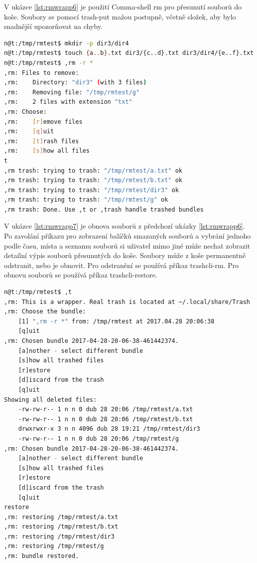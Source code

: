 \documentclass[thesis=M,czech]{FITthesis}[2012/06/26]
\begin{document}
V ukázce \ref{lst:rmwrapp6} je použití Comma-shell rm pro přesunutí souborů do koše. Soubory se pomocí trash-put mažou postupně, včetně složek, aby bylo snadnější upozorňovat na chyby.


\begin{minipage}{\linewidth}
\begin{lstlisting}[language=bash, caption={,rm - přesouvání do koše}, label={lst:rmwrapp6}]
n@t:/tmp/rmtest$ mkdir -p dir3/dir4
n@t:/tmp/rmtest$ touch {a..b}.txt dir3/{c..d}.txt dir3/dir4/{e..f}.txt g
n@t:/tmp/rmtest$ ,rm -r *
,rm: Files to remove:
,rm:    Directory: "dir3" (with 3 files)
,rm:    Removing file: "/tmp/rmtest/g"
,rm:    2 files with extension "txt"
,rm: Choose:
,rm:    [r]emove files
,rm:    [q]uit
,rm:    [t]rash files
,rm:    [s]how all files
t
,rm trash: trying to trash: "/tmp/rmtest/a.txt" ok
,rm trash: trying to trash: "/tmp/rmtest/b.txt" ok
,rm trash: trying to trash: "/tmp/rmtest/dir3" ok
,rm trash: trying to trash: "/tmp/rmtest/g" ok
,rm trash: Done. Use ,t or ,trash handle trashed bundles
\end{lstlisting}
\end{minipage}

V ukázce \ref{lst:rmwrapp7} je obnova souborů z předchozí ukázky \ref{lst:rmwrapp6}. Po zavolání příkazu pro zobrazení balíčků smazaných souborů a vybrání jednoho podle času, místa a seznamu souborů si uživatel mimo jiné může nechat zobrazit detailní výpis souborů přesunutých do koše. Soubory může z koše permanentně odstranit, nebo je obnovit. Pro odstranění se používá příkaz trashcli-rm. Pro obnovu souborů se používá příkaz trashcli-restore.

\begin{minipage}{\linewidth}
\begin{lstlisting}[language=bash, caption={,rm - obnova souborů }, label={lst:rmwrapp7}]
n@t:/tmp/rmtest$ ,t
,rm: This is a wrapper. Real trash is located at ~/.local/share/Trash
,rm: Choose the bundle:
    [1] ",rm -r *" from: /tmp/rmtest at 2017.04.28 20:06:38
    [q]uit
,rm: Chosen bundle 2017-04-28-20-06-38-461442374.
    [a]nother - select different bundle
    [s]how all trashed files
    [r]estore
    [d]iscard from the trash
    [q]uit
Showing all deleted files:
    -rw-rw-r-- 1 n n 0 dub 28 20:06 /tmp/rmtest/a.txt
    -rw-rw-r-- 1 n n 0 dub 28 20:06 /tmp/rmtest/b.txt
    drwxrwxr-x 3 n n 4096 dub 28 19:21 /tmp/rmtest/dir3
    -rw-rw-r-- 1 n n 0 dub 28 20:06 /tmp/rmtest/g
,rm: Chosen bundle 2017-04-28-20-06-38-461442374.
    [a]nother - select different bundle
    [s]how all trashed files
    [r]estore
    [d]iscard from the trash
    [q]uit
restore
,rm: restoring /tmp/rmtest/a.txt
,rm: restoring /tmp/rmtest/b.txt
,rm: restoring /tmp/rmtest/dir3
,rm: restoring /tmp/rmtest/g
,rm: bundle restored.
\end{lstlisting}
\end{minipage}
\end{document}
